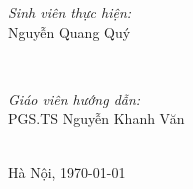 \documentclass[../report.tex]{subfiles}
\begin{document}
\begin{titlepage}
 
\begin{minipage}{0.4\textwidth}
\begin{flushleft} \large
\emph{Sinh viên thực hiện:}\\
Nguyễn Quang Quý \\
\end{flushleft}
\end{minipage}
~
\begin{minipage}{0.4\textwidth}
\begin{flushright} \large
\emph{Giáo viên hướng dẫn:} \\
PGS.TS Nguyễn Khanh Văn
\end{flushright}
\end{minipage}\\[3cm]

{\large Hà Nội, \today}\\[1cm] %



\vfill %

\end{titlepage}
\end{document}
